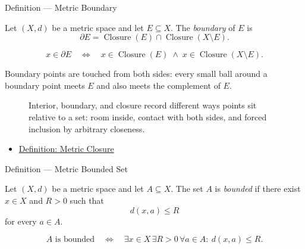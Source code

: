 \begin{definitionbox}{Definition --- Metric Boundary}
\begin{definition}\label{def:metric-boundary}
Let \((X,d)\) be a metric space and let \(E\subseteq X\).  The
\emph{boundary} of \(E\) is
\[
  \partial E
  =
  \operatorname{Closure}(E)\cap \operatorname{Closure}(X\setminus E).
\]
\end{definition}
\end{definitionbox}

\begin{remark*}
\[
x\in\partial E
\quad\Longleftrightarrow\quad
x\in\operatorname{Closure}(E)
\;\land\;
x\in\operatorname{Closure}(X\setminus E).
\]
\end{remark*}

\begin{remark*}[Interpretation]
Boundary points are touched from both sides: every small ball around a
boundary point meets \(E\) and also meets the complement of \(E\).
\end{remark*}

\begin{figure}[htbp]
\centering

\caption{Interior, boundary, and closure record different ways points sit
relative to a set: room inside, contact with both sides, and forced inclusion
by arbitrary closeness.}
\label{fig:closure-boundary-interior}
\end{figure}

\begin{dependencies}
\begin{itemize}
  \item \hyperref[def:metric-closure]{Definition: Metric Closure}
\end{itemize}
\end{dependencies}

\begin{definitionbox}{Definition --- Metric Bounded Set}
\begin{definition}\label{def:metric-bounded-set}
Let \((X,d)\) be a metric space and let \(A\subseteq X\).  The set \(A\) is
\emph{bounded} if there exist \(x\in X\) and \(R>0\) such that
\[
  d(x,a)\leq R
\]
for every \(a\in A\).
\end{definition}
\end{definitionbox}

\begin{remark*}
\[
A\text{ is bounded}
\quad\Longleftrightarrow\quad
\exists x\in X\,\exists R>0\,\forall a\in A{:}\ d(x,a)\leq R.
\]
\end{remark*}

